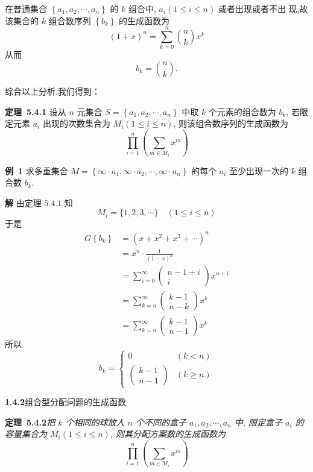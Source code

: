 \documentclass{report}
\begin{document}
在普通集合 $\left\{a_{1}, a_{2}, \cdots, a_{n}\right\}$ 的 $k$ 组合中, $a_{i}(1 \leqslant i \leqslant n)$ 或者出现或者不出 现,故该集合的 $k$ 组合数序列 $\left\{b_{k}\right\}$ 的生成函数为
$$
(1+x)^{n}=\sum_{k=0}^{n}\binom{n}{k} x^{k}
$$
从而
$$
b_{k}=\binom{n}{k}.
$$

综合以上分析,我们得到：

\noindent
\textbf{定理\ 5.4.1} 设从 $n$ 元集合 $S=\left\{a_{1}, a_{2}, \cdots, a_{n}\right\}$ 中取 $k$ 个元素的组合数为 $b_{k}$, 若限定元素 $a_{i}$ 出现的次数集合为 $M_{i}(1 \leqslant i \leqslant n)$, 则该组合数序列的生成函数为
$$
\prod_{i=1}^{n}\left(\sum_{m \in M_{i}} x^{m}\right)
$$

\noindent
\textbf{例\ 1}  求多重集合 $M=\left\{\infty \cdot a_{1}, \infty \cdot a_{2}, \cdots, \infty \cdot a_{n}\right\}$ 的每个 $a_{i}$ 至少出现一次的 $k$ 组合数 $b_{k}$.

\textbf{解  }由定理 $5.4.1$ 知
$$
M_{i}=\{1,2,3, \cdots\} \quad(1 \leqslant i \leqslant n)
$$
于是
$$
\begin{aligned}
G\left\{b_{k}\right\} &=\left(x+x^{2}+x^{3}+\cdots\right)^{n} \\
&=x^{n} \cdot \frac{1}{(1-x)^{n}} \\
&=\sum_{i=0}^{\infty}\left(\begin{array}{c}
n-1+i \\
i
\end{array}\right) x^{n+i} \\
&=\sum_{k=n}^{\infty}\left(\begin{array}{c}
k-1 \\
n-k
\end{array}\right) x^{k} \\
&=\sum_{k=n}^{\infty}\left(\begin{array}{l}
k-1 \\
n-1
\end{array}\right) x^{k}
\end{aligned}
$$
所以
$$
b_{k}=\left\{\begin{array}{ll}
0 & (k<n) \\
\left(\begin{array}{l}
k-1 \\
n-1
\end{array}\right) & (k \geqslant n)
\end{array}\right.
$$

\textbf{1.4.2}组合型分配问题的生成函数

\noindent
\textbf{定理\ 5.4.2}\textsl{把 $k$ 个相同的球放人 $n$ 个不同的盒子 $a_{1}, a_{2}, \cdots, a_{n}$ 中, 限定盒子 $a_{i}$ 的容量集合为 $M_{i}(1 \leqslant i \leqslant n)$, 则其分配方案数的生成函数为
$$
\prod_{i=1}^{n}\left(\sum_{m \in M_{i}} x^{m}\right)
$$}
\end{document}
